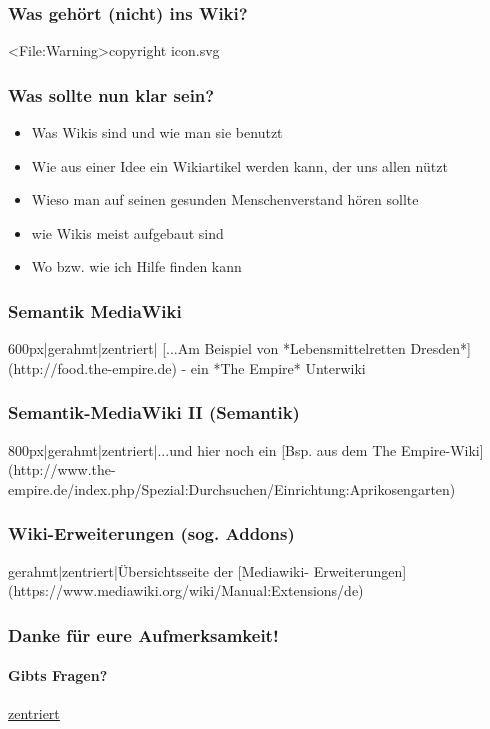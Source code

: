 \documentclass{beamer}
\begin{document}
\begin{frame}
  \frametitle{Was gehört (nicht) ins Wiki?}
  
  \textless File:Warning\textgreater  copyright icon.svg
\end{frame}

  
\begin{frame}
  \frametitle{Was sollte nun klar sein?}
  
  \begin{itemize}
    \item Was Wikis sind und wie man sie benutzt
    \item Wie aus einer Idee ein Wikiartikel werden kann, der uns allen nützt
    \item Wieso man auf seinen gesunden Menschenverstand hören sollte
    \item wie Wikis meist aufgebaut sind
    \item Wo bzw. wie ich Hilfe finden kann
  \end{itemize}
\end{frame}


\begin{frame}
  \frametitle{Semantik MediaWiki}

  600px|gerahmt|zentriert| [...Am Beispiel von *Lebensmittelretten
  Dresden*](http://food.the-empire.de) - ein *The Empire*
  Unterwiki
\end{frame}
  
\begin{frame}
  \frametitle{Semantik-MediaWiki II (Semantik)}

  800px|gerahmt|zentriert|...und hier noch ein [Bsp. aus dem The
  Empire-Wiki](http://www.the-empire.de/index.php/Spezial:Durchsuchen/Einrichtung:Aprikosengarten)
\end{frame}


\begin{frame}
  \frametitle{Wiki-Erweiterungen (sog. Addons)}

  gerahmt|zentriert|Übersichtsseite der [Mediawiki-
  Erweiterungen](https://www.mediawiki.org/wiki/Manual:Extensions/de)
\end{frame}


\begin{frame}
  \frametitle{Danke für eure Aufmerksamkeit!}
  \framesubtitle{Gibts Fragen?}
  \href{media/}{zentriert}

\end{frame}
\end{document}
